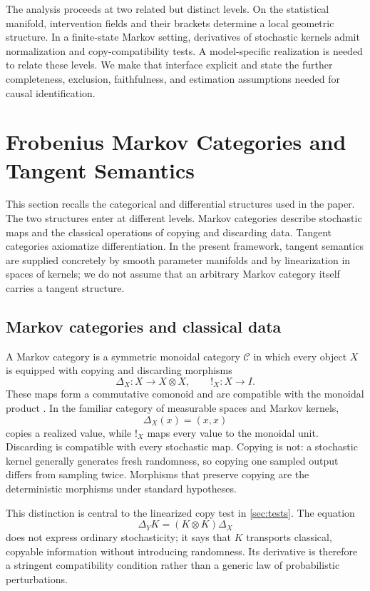 \documentclass{article}
\theoremstyle{plain}
\theoremstyle{definition}
\theoremstyle{remark}
\begin{document}
The analysis proceeds at two related but distinct levels.  On the statistical
manifold, intervention fields and their brackets determine a local geometric
structure.  In a finite-state Markov setting, derivatives of stochastic kernels
admit normalization and copy-compatibility tests.  A model-specific realization
is needed to relate these levels.  We make that interface explicit and state the
further completeness, exclusion, faithfulness, and estimation assumptions
needed for causal identification.

\section{Frobenius Markov Categories and Tangent Semantics}
\label{sec:categorical-background}

This section recalls the categorical and differential structures used in the
paper.  The two structures enter at different levels.  Markov categories
describe stochastic maps and the classical operations of copying and
discarding data.  Tangent categories axiomatize differentiation.  In the
present framework, tangent semantics are supplied concretely by smooth
parameter manifolds and by linearization in spaces of kernels; we do not assume
that an arbitrary Markov category itself carries a tangent structure.

\subsection{Markov categories and classical data}

A Markov category is a symmetric monoidal category \(\mathcal C\) in which
every object \(X\) is equipped with copying and discarding morphisms
\[
  \Delta_X:X\longrightarrow X\otimes X,
  \qquad
  !_X:X\longrightarrow I.
\]
These maps form a commutative comonoid and are compatible with the monoidal
product \citep{fritz2020synthetic}.  In the familiar category of measurable
spaces and Markov kernels,
\[
  \Delta_X(x)=(x,x)
\]
copies a realized value, while \(!_X\) maps every value to the monoidal unit.
Discarding is compatible with every stochastic map.  Copying is not: a
stochastic kernel generally generates fresh randomness, so copying one sampled
output differs from sampling twice.  Morphisms that preserve copying are the
deterministic morphisms under standard hypotheses.

This distinction is central to the linearized copy test in
\cref{sec:tests}.  The equation
\[
  \Delta_YK=(K\otimes K)\Delta_X
\]
does not express ordinary stochasticity; it says that \(K\) transports
classical, copyable information without introducing randomness.  Its
derivative is therefore a stringent compatibility condition rather than a
generic law of probabilistic perturbations.
\end{document}
